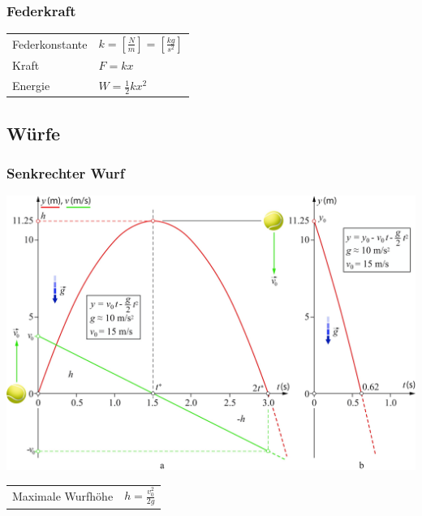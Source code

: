 \documentclass[a4paper]{scrartcl}
\begin{document}
\subsubsection{Federkraft}

	
	\begin{tabu} {l X}
		Federkonstante & $k = \left[ \frac{N}{m} \right] = \left[ \frac{kg}{s^2} \right]$ \\
		Kraft & $F = kx$ \\ %
		Energie & $	W = \frac{1}{2} k x^2$
	\end{tabu}

\subsection{Würfe}
\subsubsection{Senkrechter Wurf}
	\begin{multicols}{2}
		\includegraphics[width=\linewidth]{img/wurf_senkrecht}
		\begin{tabu} {l X}
			Maximale Wurfhöhe & $h = \frac{v^2_0}{2g}$
		\end{tabu}
	\end{multicols}
\end{document}
